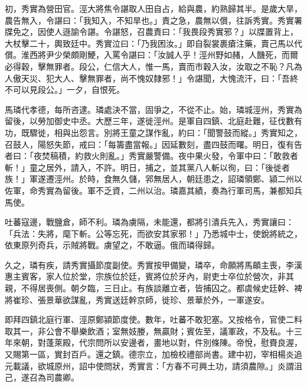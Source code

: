 \begin{pinyinscope}
 初，秀實為營田官。涇大將焦令諶取人田自占，給與農，約熟歸其半。是歲大旱，農告無入，令諶曰：「我知入，不知旱也。」責之急，農無以償，往訴秀實。秀實署牒免之，因使人遜諭令諶。令諶怒，召農責曰：「我畏段秀實邪？」以牒置背上，大杖擊二十，輿致廷中。秀實泣曰：「乃我困汝。」即自裂裳裹瘡注藥，賣己馬以代償。淮西將尹少榮頗剛鯁，入罵令諶曰：「汝誠人乎！涇州野如赭，人饑死，而爾必得穀，擊無罪者。段公，仁信大人，惟一馬，賣而市穀入汝，汝取之不恥？凡為人傲天災、犯大人、擊無罪者，尚不愧奴隸邪！」令諶聞，大愧流汗，曰：「吾終不可以見段公。」一夕，自恨死。



 馬璘代孝德，每所咨逮。璘處決不當，固爭之，不從不止。始，璘城涇州，秀實為留後，以勞加御史中丞。大歷三年，遂徙涇州。是軍自四鎮、北庭赴難，征伐數有功，既驟徙，相與出怨言。別將王童之謀作亂，約曰：「聞警鼓而縱。」秀實知之，召鼓人，陽怒失節，戒曰：「每籌盡當報。」因延數刻，盡四鼓而曙。明日，復有告者曰：「夜焚稿積，約救火則亂。」秀實嚴警備。夜中果火發，令軍中曰：「敢救者斬！」童之居外，請入，不許。明日，捕之，並其黨八人斬以徇，曰：「後徙者族！」軍遂遷涇州。於時，食無久儲，郛無居人，朝廷患之，詔璘領鄭、潁二州以佐軍，命秀實為留後。軍不乏資，二州以治。璘嘉其績，奏為行軍司馬，兼都知兵馬使。



 吐蕃寇邊，戰鹽倉，師不利。璘為虜隔，未能還，都將引潰兵先入，秀實讓曰：「兵法：失將，麾下斬。公等忘死，而欲安其家邪！」乃悉城中士，使銳將統之，依東原列奇兵，示賊將戰。虜望之，不敢逼。俄而璘得歸。



 久之，璘有疾，請秀實攝節度副使。秀實按甲備變，璘卒，命願將馬頔主喪，李漢惠主賓客，家人位於堂，宗族位於廷，賓將位於牙內，尉吏士卒位於營次，非其親，不得居喪側。朝夕臨，三日止。有族談離立者，皆捕囚之。都虞候史廷幹、裨將崔珍、張景華欲謀亂，秀實送廷幹京師，徙珍、景華於外，一軍遂安。



 即拜四鎮北庭行軍、涇原鄭潁節度使。數年，吐蕃不敢犯塞。又按格令，官使二料取其一，非公會不舉樂飲酒；室無妓媵，無贏財；賓佐至，議軍政，不及私。十三年來朝，對蓬萊殿，代宗問所以安邊者，畫地以對，件別條陳。帝悅，慰賚良渥，又賜第一區，實封百戶。還之鎮。德宗立，加檢校禮部尚書。建中初，宰相楊炎追元載議，欲城原州，詔中使問狀，秀實言：「方春不可興土功，請須農隙。」炎謂沮己，遂召為司農卿。




\end{pinyinscope}
